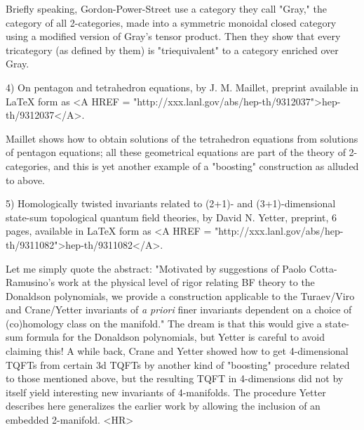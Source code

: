 Briefly speaking, Gordon-Power-Street use a category they call
"Gray," the category of all 2-categories, made into a symmetric monoidal
closed category using a modified version of Gray's tensor product.  Then
they show that every tricategory (as defined by them) is "triequivalent"
to a category enriched over Gray.  

4) On pentagon and tetrahedron equations, by J. M. Maillet, preprint
available in LaTeX form as <A HREF = "http://xxx.lanl.gov/abs/hep-th/9312037">hep-th/9312037</A>.
 
Maillet shows how to obtain solutions of the tetrahedron equations from 
solutions of pentagon equations; all these geometrical equations are
part of the theory of 2-categories, and this is yet another example of a
"boosting" construction as alluded to above.  

5) Homologically twisted invariants related to (2+1)- and (3+1)-dimensional
state-sum topological quantum field theories, by David N. Yetter,
preprint, 6 pages, available in LaTeX form as <A HREF = "http://xxx.lanl.gov/abs/hep-th/9311082">hep-th/9311082</A>.

Let me simply quote the abstract: "Motivated by suggestions of Paolo
Cotta-Ramusino's work at the physical level of rigor relating BF theory
to the Donaldson polynomials, we provide a construction applicable to
the Turaev/Viro and Crane/Yetter invariants of \emph{a priori} finer
invariants dependent on a choice of (co)homology class on the manifold."
The dream is that this would give a state-sum formula for the Donaldson
polynomials, but Yetter is careful to avoid claiming this!  A while
back, Crane and Yetter showed how to get 4-dimensional TQFTs from certain 3d
TQFTs by another kind of "boosting" procedure related to those mentioned
above, but the resulting TQFT in 4-dimensions did not by itself yield
interesting new invariants of 4-manifolds.  The procedure Yetter
describes here generalizes the earlier work by allowing the inclusion of
an embedded 2-manifold.  
<HR>




